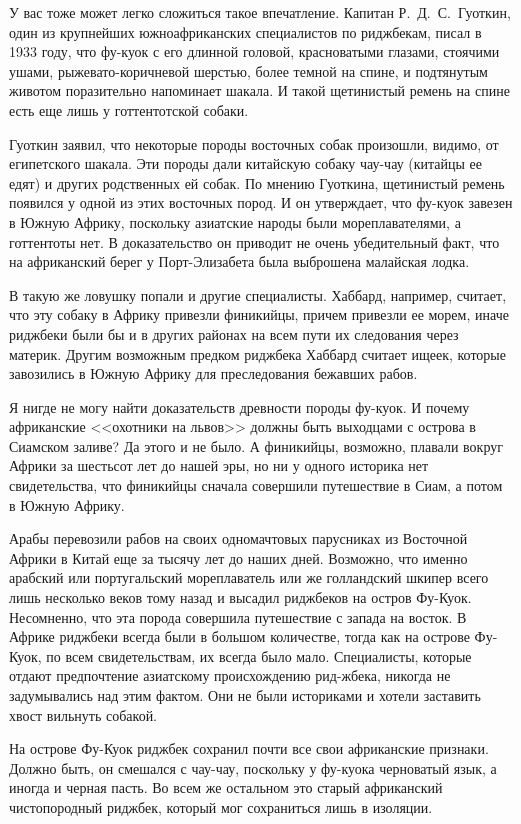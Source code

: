 \documentclass[12pt,a4paper,twoside,openany,svgnames]{memoir}
\begin{document}
У вас тоже может легко сложиться такое впечатление. Капитан Р.~Д.~С.~Гуоткин, один из крупнейших южноафриканских специалистов по риджбекам, писал в 1933 году, что фу-куок с его длинной головой, красноватыми глазами, стоячими ушами, рыжевато-коричневой шерстью, более темной на спине, и подтянутым животом поразительно напоминает шакала. И такой щетинистый ремень на спине есть еще лишь у готтентотской собаки.

Гуоткин заявил, что некоторые породы восточных собак произошли, видимо, от египетского шакала. Эти породы дали китайскую собаку чау-чау (китайцы ее едят) и других родственных ей собак. По мнению Гуоткина, щетинистый ремень появился у одной из этих восточных пород. И он утверждает, что фу-куок завезен в Южную Африку, поскольку азиатские народы были мореплавателями, а готтентоты нет. В доказательство он приводит не очень убедительный факт, что на африканский берег у Порт-Элизабета была выброшена малайская лодка.

В такую же ловушку попали и другие специалисты. Хаббард, например, считает, что эту собаку в Африку привезли финикийцы, причем привезли ее морем, иначе риджбеки были бы и в других районах на всем пути их следования через материк. Другим возможным предком риджбека Хаббард считает ищеек, которые завозились в Южную Африку для преследования бежавших рабов.

Я нигде не могу найти доказательств древности породы фу-куок. И почему африканские <<охотники на львов>> должны быть выходцами с острова в Сиамском заливе? Да этого и не было. А финикийцы, возможно, плавали вокруг Африки за шестьсот лет до нашей эры, но ни у одного историка нет свидетельства, что финикийцы сначала совершили путешествие в Сиам, а потом в Южную Африку.

Арабы перевозили рабов на своих одномачтовых парусниках из Восточной Африки в Китай еще за тысячу лет до наших дней. Возможно, что именно арабский или португальский мореплаватель или же голландский шкипер всего лишь несколько веков тому назад и высадил риджбеков на остров Фу-Куок. Несомненно, что эта порода совершила путешествие с запада на восток. В Африке риджбеки всегда были в большом количестве, тогда как на острове Фу-Куок, по всем свидетельствам, их всегда было мало. Специалисты, которые отдают предпочтение азиатскому происхождению рид-жбека, никогда не задумывались над этим фактом. Они не были историками и хотели заставить хвост вильнуть собакой.

На острове Фу-Куок риджбек сохранил почти все свои африканские признаки. Должно быть, он смешался с чау-чау, поскольку у фу-куока черноватый язык, а иногда и черная пасть. Во всем же остальном это старый африканский чистопородный риджбек, который мог сохраниться лишь в изоляции.
\end{document}
